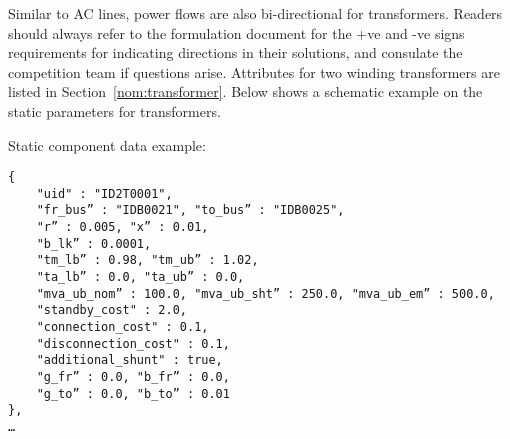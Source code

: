 Similar to AC lines, power flows are also bi-directional for transformers. 
Readers should always refer to the formulation document for the +ve and -ve signs
requirements for indicating directions in their solutions,
and consulate the competition team if questions arise.
Attributes for two winding transformers are listed in Section~\ref{nom:transformer}.
Below shows a schematic example on the static parameters for transformers.

Static component data example:
\begin{verbatim}
{
    "uid" : "ID2T0001",
    "fr_bus” : "IDB0021", "to_bus” : "IDB0025",
    "r” : 0.005, "x” : 0.01, 
    "b_lk” : 0.0001,
    "tm_lb” : 0.98, "tm_ub” : 1.02, 
    "ta_lb” : 0.0, "ta_ub” : 0.0, 
    "mva_ub_nom” : 100.0, "mva_ub_sht” : 250.0, "mva_ub_em” : 500.0,
    "standby_cost" : 2.0,
    "connection_cost" : 0.1,
    "disconnection_cost" : 0.1,
    "additional_shunt" : true,
    "g_fr” : 0.0, "b_fr” : 0.0,
    "g_to” : 0.0, "b_to” : 0.01    
},
…     
\end{verbatim}



